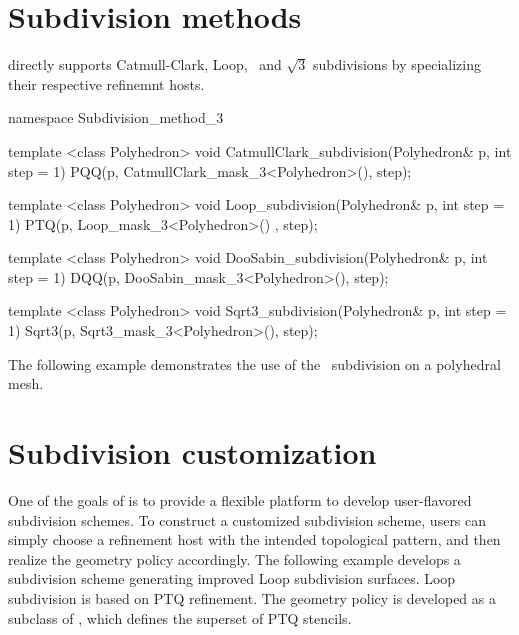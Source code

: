 



\section{Subdivision methods}
 directly supports 
Catmull-Clark, Loop, \DS\ and $\sqrt{3}$ subdivisions by specializing
their respective refinemnt hosts.

\begin{ccExampleCode}
namespace Subdivision_method_3 {
  template <class Polyhedron>
  void CatmullClark_subdivision(Polyhedron& p, int step = 1) {
    PQQ(p, CatmullClark_mask_3<Polyhedron>(), step);
  }

  template <class Polyhedron>
  void Loop_subdivision(Polyhedron& p, int step = 1) {
    PTQ(p, Loop_mask_3<Polyhedron>() , step);
  }

  template <class Polyhedron>
  void DooSabin_subdivision(Polyhedron& p, int step = 1) {
    DQQ(p, DooSabin_mask_3<Polyhedron>(), step);
  }

  template <class Polyhedron>
  void Sqrt3_subdivision(Polyhedron& p, int step = 1) {
    Sqrt3(p, Sqrt3_mask_3<Polyhedron>(), step);
  }
}
\end{ccExampleCode}

The following example demonstrates the use of the \DS\ subdivision 
on a polyhedral mesh.

\section{Subdivision customization}
One of the goals of  is 
to provide a flexible platform
to develop user-flavored subdivision schemes.
To construct a customized subdivision scheme, users can simply 
choose a refinement host with the intended topological pattern, 
and then realize the geometry policy accordingly. 
The following example develops a subdivision scheme
generating improved Loop subdivision surfaces. Loop subdivision is
based on PTQ refinement. The geometry policy is developed as a subclass 
of , which defines the superset of PTQ stencils.

